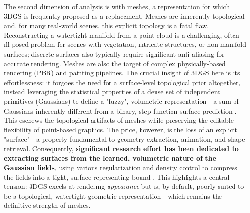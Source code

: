 \documentclass[11pt,a4paper]{article}
\begin{document}
The second dimension of analysis is with meshes, a representation for which 3DGS is frequently proposed as a replacement. Meshes are inherently topological and, for many real-world scenes, this explicit topology is a fatal flaw. Reconstructing a watertight manifold from a point cloud is a challenging, often ill-posed problem for scenes with vegetation, intricate structures, or non-manifold surfaces; discrete surfaces also typically require significant anti-aliasing for accurate rendering. Meshes are also the target of complex physically-based rendering (PBR) and painting pipelines. The crucial insight of 3DGS here is its effortlessness: it forgoes the need for a surface-level topological prior altogether, instead leveraging the statistical properties of a dense set of independent primitives (Gaussians) to define a "fuzzy", volumetric representation---a sum of Gaussians inherently different from a binary, step-function surface prediction \cite{arxiv:2106.03452v2}. This eschews the topological artifacts of meshes while preserving the editable flexibility of point-based graphics. The price, however, is the loss of an explicit "surface"---a property fundamental to geometry extraction, animation, and shape retrieval. Consequently, \textbf{significant research effort has been dedicated to extracting surfaces from the learned, volumetric nature of the Gaussian fields}, using various regularization and density control to compress the fields into a tight, surface-representing bound \cite{arxiv:2404.00409v1,arxiv:2406.07499v1}. This highlights a central tension: 3DGS excels at rendering \emph{appearance} but is, by default, poorly suited to be a topological, watertight geometric representation---which remains the definitive strength of meshes.
\end{document}
